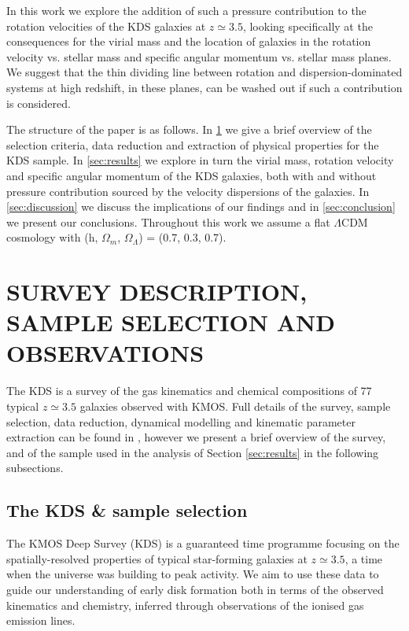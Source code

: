 \documentclass[fleqn,usenatbib]{mnras}
\begin{document}
\noindent
In this work we explore the addition of such a pressure contribution to the rotation velocities of the KDS galaxies at $z\simeq3.5$, looking specifically at the consequences for the virial mass and the location of galaxies in the rotation velocity vs. stellar mass and specific angular momentum vs. stellar mass planes.
We suggest that the thin dividing line between rotation and dispersion-dominated systems at high redshift, in these planes, can be washed out if such a contribution is considered. 

The structure of the paper is as follows.
In \cref{sec:sample_and_dr} we give a brief overview of the selection criteria, data reduction and extraction of physical properties for the KDS sample.
In \cref{sec:results} we explore in turn the virial mass, rotation velocity and specific angular momentum of the KDS galaxies, both with and without pressure contribution sourced by the velocity dispersions of the galaxies.
In \cref{sec:discussion} we discuss the implications of our findings and in \cref{sec:conclusion} we present our conclusions.
Throughout this work we assume a flat $\Lambda$CDM cosmology with (h, $\Omega_{m}$, $\Omega_{\Lambda}$) = (0.7, 0.3, 0.7). 

\section{SURVEY DESCRIPTION, SAMPLE SELECTION AND OBSERVATIONS}\label{sec:sample_and_dr}
The KDS is a survey of the gas kinematics and chemical compositions of 77 typical $z\simeq3.5$ galaxies observed with KMOS.
Full details of the survey, sample selection, data reduction, dynamical modelling and kinematic parameter extraction can be found in \cite{Turner2017}, however we present a brief overview of the survey, and of the sample used in the analysis of Section \ref{sec:results} in the following subsections.

\subsection{The KDS \& sample selection}\label{subsec:sample_selection}
The KMOS Deep Survey (KDS) is a guaranteed time programme focusing on the spatially-resolved properties of typical star-forming galaxies at $z\simeq3.5$, a time when the universe was building to peak activity.
We aim to use these data to guide our understanding of early disk formation both in terms of the observed kinematics and chemistry, inferred through observations of the ionised gas emission lines.
\end{document}
